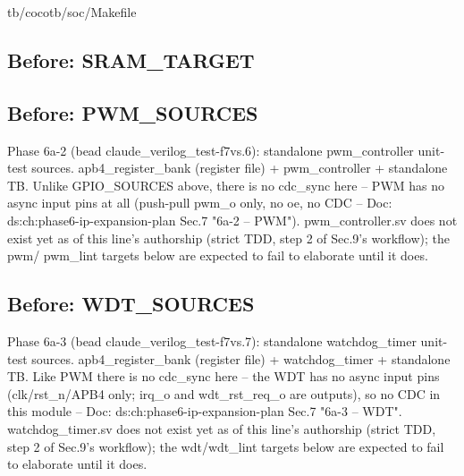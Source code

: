 \begin{relocated}{tb/cocotb/soc/Makefile}
\subsection*{Before: SRAM\_TARGET}


\subsection*{Before: PWM\_SOURCES}

\begin{textblock}
Phase 6a-2 (bead claude_verilog_test-f7vs.6): standalone pwm_controller unit-test sources.
apb4_register_bank (register file) + pwm_controller + standalone TB. Unlike GPIO_SOURCES above,
there is no cdc_sync here -- PWM has no async input pins at all (push-pull pwm_o only, no
oe, no CDC -- Doc: ds:ch:phase6-ip-expansion-plan Sec.7 "6a-2 -- PWM"). pwm_controller.sv does not
exist yet as of this line's authorship (strict TDD, step 2 of Sec.9's workflow); the pwm/
pwm_lint targets below are expected to fail to elaborate until it does.
\end{textblock}

\subsection*{Before: WDT\_SOURCES}

\begin{textblock}
Phase 6a-3 (bead claude_verilog_test-f7vs.7): standalone watchdog_timer unit-test sources.
apb4_register_bank (register file) + watchdog_timer + standalone TB. Like PWM there is no
cdc_sync here -- the WDT has no async input pins (clk/rst_n/APB4 only; irq_o and
wdt_rst_req_o are outputs), so no CDC in this module -- Doc: ds:ch:phase6-ip-expansion-plan Sec.7
"6a-3 -- WDT". watchdog_timer.sv does not exist yet as of this line's authorship (strict TDD,
step 2 of Sec.9's workflow); the wdt/wdt_lint targets below are expected to fail to elaborate
until it does.
\end{textblock}


\end{relocated}
